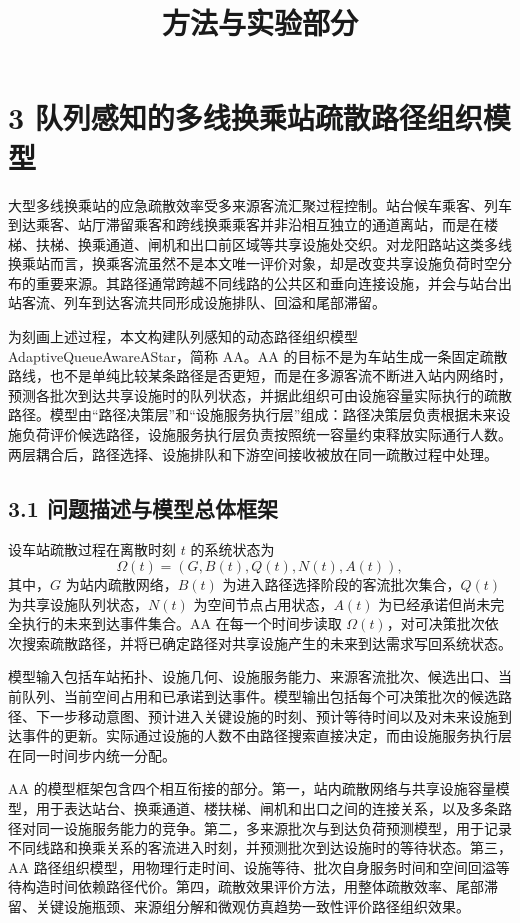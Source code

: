 \documentclass[UTF8,a4paper,12pt]{ctexart}
\title{方法与实验部分}
\author{}
\date{}
\begin{document}
\maketitle

\section{3 队列感知的多线换乘站疏散路径组织模型}

大型多线换乘站的应急疏散效率受多来源客流汇聚过程控制。站台候车乘客、列车到达乘客、站厅滞留乘客和跨线换乘乘客并非沿相互独立的通道离站，而是在楼梯、扶梯、换乘通道、闸机和出口前区域等共享设施处交织。对龙阳路站这类多线换乘站而言，换乘客流虽然不是本文唯一评价对象，却是改变共享设施负荷时空分布的重要来源。其路径通常跨越不同线路的公共区和垂向连接设施，并会与站台出站客流、列车到达客流共同形成设施排队、回溢和尾部滞留。

为刻画上述过程，本文构建队列感知的动态路径组织模型 AdaptiveQueueAwareAStar，简称 AA。AA 的目标不是为车站生成一条固定疏散路线，也不是单纯比较某条路径是否更短，而是在多源客流不断进入站内网络时，预测各批次到达共享设施时的队列状态，并据此组织可由设施容量实际执行的疏散路径。模型由“路径决策层”和“设施服务执行层”组成：路径决策层负责根据未来设施负荷评价候选路径，设施服务执行层负责按照统一容量约束释放实际通行人数。两层耦合后，路径选择、设施排队和下游空间接收被放在同一疏散过程中处理。

\subsection{3.1 问题描述与模型总体框架}

设车站疏散过程在离散时刻 \(t\) 的系统状态为
\[
\Omega(t)=\left(G,B(t),Q(t),N(t),A(t)\right),
\]
其中，\(G\) 为站内疏散网络，\(B(t)\) 为进入路径选择阶段的客流批次集合，\(Q(t)\) 为共享设施队列状态，\(N(t)\) 为空间节点占用状态，\(A(t)\) 为已经承诺但尚未完全执行的未来到达事件集合。AA 在每一个时间步读取 \(\Omega(t)\)，对可决策批次依次搜索疏散路径，并将已确定路径对共享设施产生的未来到达需求写回系统状态。

模型输入包括车站拓扑、设施几何、设施服务能力、来源客流批次、候选出口、当前队列、当前空间占用和已承诺到达事件。模型输出包括每个可决策批次的候选路径、下一步移动意图、预计进入关键设施的时刻、预计等待时间以及对未来设施到达事件的更新。实际通过设施的人数不由路径搜索直接决定，而由设施服务执行层在同一时间步内统一分配。

AA 的模型框架包含四个相互衔接的部分。第一，站内疏散网络与共享设施容量模型，用于表达站台、换乘通道、楼扶梯、闸机和出口之间的连接关系，以及多条路径对同一设施服务能力的竞争。第二，多来源批次与到达负荷预测模型，用于记录不同线路和换乘关系的客流进入时刻，并预测批次到达设施时的等待状态。第三，AA 路径组织模型，用物理行走时间、设施等待、批次自身服务时间和空间回溢等待构造时间依赖路径代价。第四，疏散效果评价方法，用整体疏散效率、尾部滞留、关键设施瓶颈、来源组分解和微观仿真趋势一致性评价路径组织效果。
\end{document}
